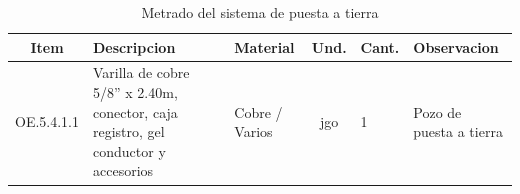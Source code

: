 \begin{table}[H]
\centering
\small
\caption{Metrado del sistema de puesta a tierra}
\label{tab:metrado-puesta-tierra}
\begin{tabularx}{\textwidth}{c L{4.5cm} L{2.0cm} c L{2.5cm} Y}
\toprule
\textbf{Item} & \textbf{Descripcion} & \textbf{Material} & \textbf{Und.} & \textbf{Cant.} & \textbf{Observacion} \\
\midrule
OE.5.4.1.1 & Varilla de cobre 5/8'' x 2.40m, conector, caja registro, gel conductor y accesorios & Cobre / Varios & jgo & 1 & Pozo de puesta a tierra \\
\bottomrule
\end{tabularx}
\end{table}

